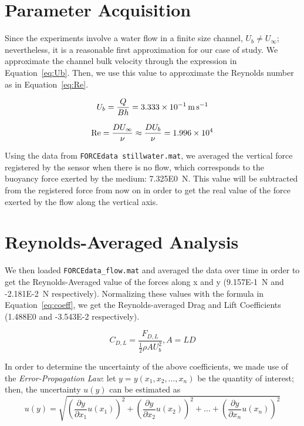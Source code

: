 \documentclass[12pt]{article}
\begin{document}
\section{Parameter Acquisition} \label{sec:setup}

        Since the experiments involve a water flow in a finite size channel, $ U_b \neq U_\infty $; nevertheless, it is a reasonable first approximation for our case of study. We approximate the channel bulk velocity through the expression in Equation~\ref{eq:Ub}. Then, we use this value to approximate the Reynolds number as in Equation~\ref{eq:Re}.

        \begin{equation} \label{eq:Ub}
                U_b = \frac{Q}{B h} = \SI{3.333E-1}{\metre \per \second}
        \end{equation}

        \begin{equation} \label{eq:Re}
                \text{Re} = \frac{D U_\infty}{\nu} \approx \frac{D U_b}{\nu} = \num{1.996E4}
        \end{equation}

        Using the data from \texttt{FORCEdata stillwater.mat}, we averaged the vertical force registered by the sensor when there is no flow, which corresponds to the buoyancy force exerted by the medium: \SI{7.325E0}{\newton}. This value will be subtracted from the registered force from now on in order to get the real value of the force exerted by the flow along the vertical axis.

\section{Reynolds-Averaged Analysis} \label{sec:static}

        We then loaded \texttt{FORCEdata\_flow.mat} and averaged the data over time in order to get the Reynolds-Averaged value of the forces along x and y (\SI{9.157E-1}{\newton} and \SI{-2.181E-2}{\newton} respectively). Normalizing these values with the formula in Equation~\ref{eq:coeff}, we get the Reynolds-averaged Drag and Lift Coefficients (\num{1.488E0} and \num{-3.543E-2} respectively).

        \begin{equation} \label{eq:coeff}
                C_{D,L} = \frac{F_{D,L}}{\frac{1}{2} \rho A U_b^2} , A=LD
        \end{equation}

        In order to determine the uncertainty of the above coefficients, we made use of the \textit{Error-Propagation Law}: let $y=y(x_1,x_2,\dots,x_n)$ be the quantity of interest; then, the uncertainty $u(y)$ can be estimated as $$u(y) = \sqrt{\left(\frac{\partial y}{\partial x_1} u(x_1)\right)^2 + \left(\frac{\partial y}{\partial x_2} u(x_2)\right)^2 + \dots + \left(\frac{\partial y}{\partial x_n} u(x_n)\right)^2}$$
\end{document}
